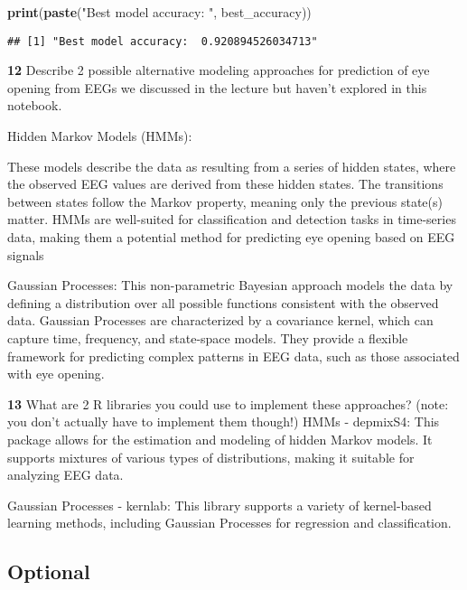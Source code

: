 \documentclass[
]{article}
\newenvironment{Shaded}{\begin{snugshade}}{\end{snugshade}}
\newcommand{\FunctionTok}[1]{\textcolor[rgb]{0.13,0.29,0.53}{\textbf{#1}}}
\newcommand{\NormalTok}[1]{#1}
\newcommand{\StringTok}[1]{\textcolor[rgb]{0.31,0.60,0.02}{#1}}
\begin{document}
\begin{Shaded}
\begin{Highlighting}[]
\FunctionTok{print}\NormalTok{(}\FunctionTok{paste}\NormalTok{(}\StringTok{"Best model accuracy: "}\NormalTok{, best\_accuracy))}
\end{Highlighting}
\end{Shaded}

\begin{verbatim}
## [1] "Best model accuracy:  0.920894526034713"
\end{verbatim}

\textbf{12} Describe 2 possible alternative modeling approaches for
prediction of eye opening from EEGs we discussed in the lecture but
haven't explored in this notebook.

Hidden Markov Models (HMMs):

These models describe the data as resulting from a series of hidden
states, where the observed EEG values are derived from these hidden
states. The transitions between states follow the Markov property,
meaning only the previous state(s) matter. HMMs are well-suited for
classification and detection tasks in time-series data, making them a
potential method for predicting eye opening based on EEG signals

Gaussian Processes: This non-parametric Bayesian approach models the
data by defining a distribution over all possible functions consistent
with the observed data. Gaussian Processes are characterized by a
covariance kernel, which can capture time, frequency, and state-space
models. They provide a flexible framework for predicting complex
patterns in EEG data, such as those associated with eye
opening\hspace{0pt}.

\textbf{13} What are 2 R libraries you could use to implement these
approaches? (note: you don't actually have to implement them though!)
HMMs - depmixS4: This package allows for the estimation and modeling of
hidden Markov models. It supports mixtures of various types of
distributions, making it suitable for analyzing EEG data.

Gaussian Processes - kernlab: This library supports a variety of
kernel-based learning methods, including Gaussian Processes for
regression and classification.

\subsection{Optional}\label{optional}
\end{document}
